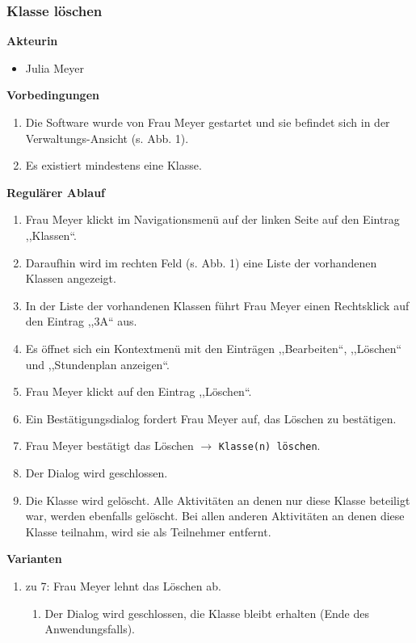 \documentclass[fontsize=12pt,paper=a4,twoside]{scrartcl}
\begin{document}
\subsubsection{Klasse löschen}
\label{subsubsec:KlasseLoeschen}

\textbf{Akteurin}
\begin{itemize}
\item Julia Meyer
\end{itemize}
\vspace{5pt}


\textbf{Vorbedingungen}
\begin{enumerate}
\item Die Software wurde von Frau Meyer gestartet und sie befindet sich in der Verwaltungs-Ansicht (s. Abb. 1).
\item Es existiert mindestens eine Klasse.
\end{enumerate}
\vspace{5pt}


\textbf{Regulärer Ablauf}
\begin{enumerate}
\item Frau Meyer klickt im Navigationsmenü auf der linken Seite auf den Eintrag ,,Klassen``.
\item Daraufhin wird im rechten Feld (s. Abb. 1) eine Liste der vorhandenen Klassen angezeigt.
\item In der Liste der vorhandenen Klassen f\"uhrt Frau Meyer einen Rechtsklick auf den Eintrag ,,3A`` aus.
\item Es \"offnet sich ein Kontextmen\"u mit den Eintr\"agen ,,Bearbeiten``, ,,L\"oschen`` und ,,Stundenplan anzeigen``.
\item Frau Meyer klickt auf den Eintrag ,,Löschen``.
\item Ein Bestätigungsdialog fordert Frau Meyer auf, das Löschen zu bestätigen.
\item Frau Meyer bestätigt das Löschen $\rightarrow$ \texttt{Klasse(n) löschen}.
\item Der Dialog wird geschlossen.
\item Die Klasse wird gelöscht. Alle Aktivitäten an denen nur diese Klasse beteiligt war, werden ebenfalls gelöscht. Bei allen anderen Aktivitäten an denen diese Klasse teilnahm, wird sie als Teilnehmer entfernt.
\end{enumerate}
\vspace{5pt}


\textbf{Varianten}
\begin{enumerate}
\item zu 7: Frau Meyer lehnt das Löschen ab. 
	\begin{enumerate}[label=\arabic*.]
	\item Der Dialog wird geschlossen, die Klasse bleibt erhalten (Ende des Anwendungsfalls).
	\end{enumerate}
\end{enumerate}
\vspace{5pt}
\end{document}
